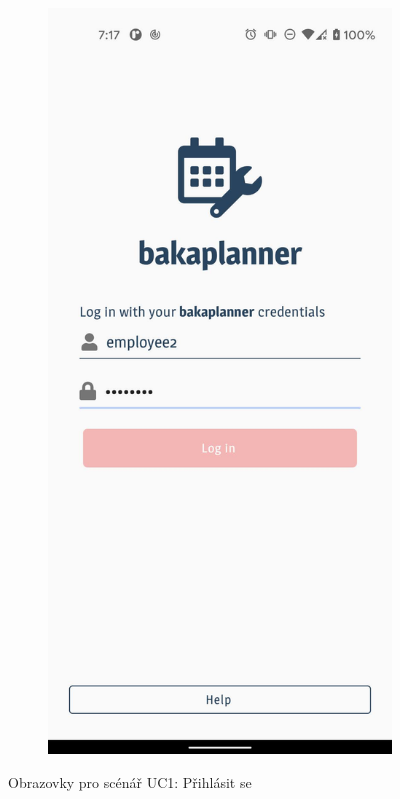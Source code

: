 \documentclass[twoside]{ctuthesis}
\begin{document}
\begin{figure}[h]
	\begin{subfigure}[h!]{.5\textwidth}
		\centering
		\includegraphics[width=.9\linewidth]{img/uc1_screen002.jpg}
		\label{fig:uc1-login}
	\end{subfigure}
	\caption{Obrazovky pro scénář UC1: Přihlásit se}
\end{figure}
\end{document}
